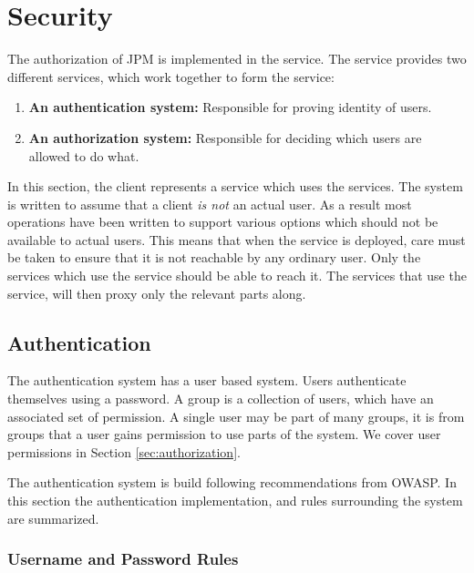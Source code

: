 \section{Security}
\label{sec:security}

The authorization of JPM is implemented in the \security service. The \security
service provides two different services, which work together to form the
\security service:

\begin{enumerate}

    \item \textbf{An authentication system:} Responsible for proving identity
        of users.

    \item \textbf{An authorization system:} Responsible for deciding which
        users are allowed to do what.

\end{enumerate}

In this section, the client represents a service which uses the \security
services. The system is written to assume that a client \emph{is not} an actual
user. As a result most operations have been written to support various options
which should not be available to actual users. This means that when the
\security service is deployed, care must be taken to ensure that it is not
reachable by any ordinary user. Only the services which use the \security
service should be able to reach it. The services that use the \security
service, will then proxy only the relevant parts along.

\subsection{Authentication}
\label{sec:authentication}

The authentication system has a user based system. Users authenticate
themselves using a password. A group is a collection of users, which have an
associated set of permission. A single user may be part of many groups, it is
from groups that a user gains permission to use parts of the system. We cover
user permissions in Section \ref{sec:authorization}.

The authentication system is build following recommendations from
OWASP\autocite{OWASP1,OWASP2,OWASP3}. In this section the
authentication implementation, and rules surrounding the system are summarized.

\subsubsection*{Username and Password Rules}

